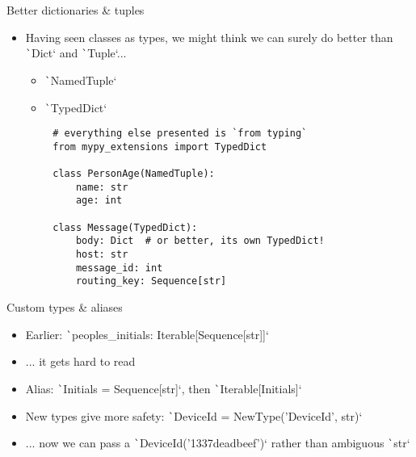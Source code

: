 \documentclass[10pt]{beamer}
\begin{document}
\begin{frame}[fragile]{Better dictionaries \& tuples}
    \begin{itemize}[<+->]
        \item Having seen classes as types, we might think we can surely do better than \texttt`Dict` and \texttt`Tuple`...
        \begin{itemize}
            \item \texttt`NamedTuple`
            \item \texttt`TypedDict`
        \end{itemize}
    \end{itemize}
    
    \pause\begin{verbatim}
        # everything else presented is `from typing`
        from mypy_extensions import TypedDict
        
        class PersonAge(NamedTuple):
            name: str
            age: int
            
        class Message(TypedDict):
            body: Dict  # or better, its own TypedDict!
            host: str
            message_id: int
            routing_key: Sequence[str]
    \end{verbatim}
\end{frame}

\begin{frame}{Custom types \& aliases}
    \begin{itemize}[<+->]
        \item Earlier: \texttt`peoples_initials: Iterable[Sequence[str]]`
        \item ... it gets hard to read
        \item Alias: \texttt`Initials = Sequence[str]`, then \texttt`Iterable[Initials]`
        \item New types give more safety: \texttt`DeviceId = NewType('DeviceId', str)`
        \item ... now we can pass a \texttt`DeviceId('1337deadbeef')` rather than ambiguous \texttt`str`
    \end{itemize}

\end{frame}
\end{document}
